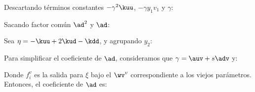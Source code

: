 Descartando términos constantes $- \gamma^2  \kuu $, $- \gamma y_1 v_1$ y $\gamma$:





Sacando factor común $\ad^2$ y $\ad$:

Sea $\eta = -\kuu +  2 \kud - \kdd$, y agrupando $y_2$:


Para simplificar el coeficiente de $\ad$, consideramos que $\gamma = \auv+ s \adv$ y:


Donde $f_i^v$ es la salida para $\xi$ bajo el $\wv^v$ correspondiente a los viejos parámetros. Entonces, el coeficiente de $\ad$ es:

